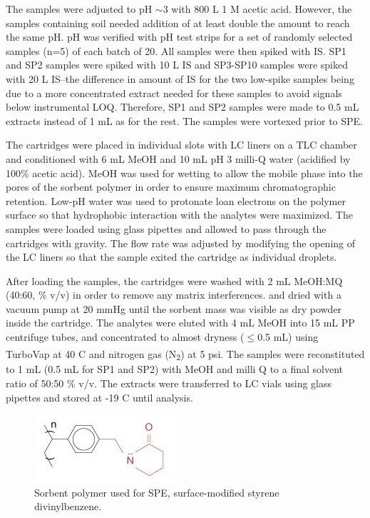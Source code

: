 The samples were adjusted to pH $\sim$3 with 800 \textmu L 1 M acetic acid. However, the samples containing soil needed addition of at least double the amount to reach the same pH. pH was verified with pH test strips for a set of randomly selected samples (n=5) of each batch of 20. All samples were then spiked with IS. SP1 and SP2 samples were spiked with 10 \textmu L IS and SP3-SP10 samples were spiked with 20 \textmu L IS--the difference in amount of IS for the two low-spike samples being due to a more concentrated extract needed for these samples to avoid signals below instrumental LOQ. Therefore, SP1 and SP2 samples were made to 0.5 mL extracts instead of 1 mL as for the rest. The samples were vortexed prior to SPE.

The cartridges were placed in individual slots with LC liners on a TLC chamber and conditioned with 6 mL MeOH and 10 mL pH 3 milli-Q water (acidified by 100\% acetic acid). MeOH was used for wetting to allow the mobile phase into the pores of the sorbent polymer in order to ensure maximum chromatographic retention. Low-pH water was used to protonate loan electrons on the polymer surface so that hydrophobic interaction with the analytes were maximized. The samples were loaded using glass pipettes and allowed to pass through the cartridges with gravity. The flow rate was adjusted by modifying the opening of the LC liners so that the sample exited the cartridge as individual droplets. 

After loading the samples, the cartridges were washed with 2 mL MeOH:MQ (40:60, \% v/v) in order to remove any matrix interferences.  and dried with a vacuum pump at 20 mmHg until the sorbent mass was visible as dry powder inside the cartridge. The analytes were eluted with 4 mL MeOH into 15 mL PP centrifuge tubes, and concentrated to almost dryness ($\le$0.5 mL) using TurboVap\textsuperscript{\textregistered} at 40 \textdegree C and nitrogen gas (N\textsubscript{2}) at 5 psi. The samples were reconstituted to 1 mL (0.5 mL for SP1 and SP2) with MeOH and milli Q to a final solvent ratio of 50:50 \% v/v. The extracts were transferred to LC vials using glass pipettes and stored at -19 \textdegree C until analysis.

\begin{figure}
    \centering
    \includegraphics{Bilder/SPE_LCMS/mg_spe_strata-x.jpg}
    \caption{Sorbent polymer used for SPE, surface-modified styrene divinylbenzene.}
    \label{fig:StatPhase}
\end{figure}

